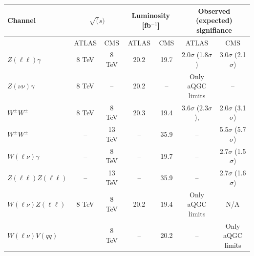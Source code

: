 \begin{table}[htb]
\centering
\begin{tabular}{|l|c|c|c|c|c|c|}
    \hline
    Channel & \multicolumn{2}{c|}{$\sqrt(s)$} & \multicolumn{2}{c|}{Luminosity [fb$^{-1}$]} & \multicolumn{2}{c|}{Observed (expected) signifiance} \\
    \hline
                                 & ATLAS                 & CMS     & ATLAS & CMS  & ATLAS                                                             & CMS                                                  \\
    $Z(\ell\ell)\gamma$          & 8 TeV                 & 8 TeV   & 20.2  & 19.7 & 2.0$\sigma$ (1.8$\sigma$)\cite{Aaboud:2017pds}                    & 3.0$\sigma$ (2.1$\sigma$)\cite{Khachatryan:2017jub}  \\
    $Z(\nu\nu)\gamma$            & 8 TeV                 & --      & 20.2  & --   & Only aQGC limits \cite{Aaboud:2017pds}                            & --                                                   \\
    $W^\pm W^\pm$                & 8 TeV                 & 8 TeV   & 20.3  & 19.4 & 3.6$\sigma$ (2.3$\sigma$)\cite{Aaboud:2016ffv},\cite{Aad:2014zda} & 2.0$\sigma$ (3.1$\sigma$)\cite{Khachatryan:2014sta}  \\
    $W^\pm W^\pm$                &  --                   & 13 TeV  & --    & 35.9 & --                                                                & 5.5$\sigma$ (5.7$\sigma$)\cite{CMS:2017adb}          \\
    $W(\ell\nu)\gamma$           &  --                   & 8 TeV   & --    & 19.7 & --                                                                & 2.7$\sigma$ (1.5$\sigma$) \cite{Khachatryan:2016vif} \\
    $Z(\ell\ell)Z(\ell\ell)$     &  --                   & 13 TeV  & --    & 35.9 & --                                                                & 2.7$\sigma$ (1.6$\sigma$) \cite{Sirunyan:2017fvv}    \\
    $W(\ell\nu)Z(\ell\ell)$      & 8 TeV                 & 8 TeV   & 20.2  & 19.4   & Only aQGC limits \cite{Aad:2016ett}                             & N/A \cite{Khachatryan:2014sta}                                                   \\
    $W(\ell\nu)V(qq)$            & \cite{Aaboud:2016uuk} & 8 TeV   & --    & 20.2 & --                                                                & Only aQGC limits                                     \\

\end{tabular}
\end{table}
